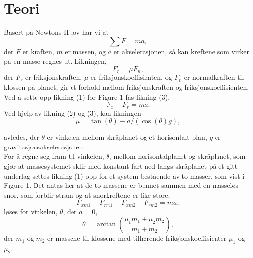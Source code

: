 \documentclass[10pt,a4paper]{report}
\begin{document}
{\let\clearpage\relax\chapter*{Teori}}
Basert på Newtons II lov har vi at 
\begin{equation}
\sum{F} = ma,
\end{equation} der $F$ er kraften, $m$ er massen, og $a$ er akselerasjonen, så kan kreftene som virker på en masse regnes ut. Likningen,
\begin{equation}
F_r = \mu F_n,
\end{equation}
der $F_r$ er friksjonskraften, $\mu$ er friksjonskoeffisienten, og $F_n$ er normalkraften til klossen på planet, gir et forhold mellom friksjonskraften og friksjonskoeffisienten. Ved å sette opp likning (1) for Figure 1 fås likning (3),
\begin{equation}
F_x - F_r = ma.
\end{equation}
 Ved hjelp av likning (2) og (3), kan likningen 
\begin{equation}
\mu = \tan(\theta)-a/(\cos(\theta)g),
\end{equation}


avledes, der $\theta$ er vinkelen mellom skråplanet og et horisontalt plan, $g$ er gravitasjonsakselerasjonen. \\
For å regne seg fram til vinkelen, $\theta$, mellom horisontalplanet og skråplanet, som gjør at massesystemet sklir med konstant fart ned langs skråplanet på et gitt underlag settes likning (1) opp for et system bestående av to masser, som vist i Figure 1. Det antas her at de to massene er bunnet sammen med en masseløs snor, som forblir stram og at snorkreftene er like store.
\begin{equation}
F_{xm1} - F_{rm1} + F_{xm2} - F_{rm2} = ma,
\end{equation}
løses for vinkelen, $\theta$, der $a = 0$, 
\begin{equation}
\theta = \arctan(\frac{\mu_1m_1+\mu_2m_2}{m_1+m_2}),
\end{equation}
der $m_1$ og $m_2$ er massene til klossene med tilhørende friksjonskoeffisienter $\mu_1$ og $\mu_2$.
\end{document}
